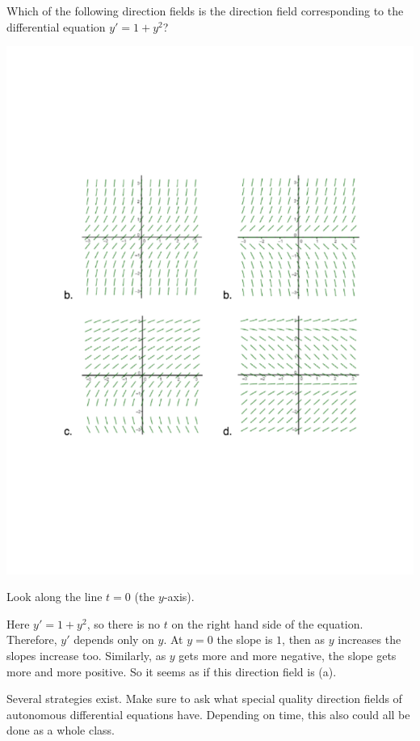\documentclass[noinstructornotes]{ximera}
\begin{document}
\begin{problem}
Which of the following direction fields is the direction field corresponding to the differential equation $y' = 1+y^2$?

	
	\begin{image}
	\includegraphics[trim= 250 200 250 200,scale=0.8]{Figure8-2-3.pdf}
	\end{image}
	
	\begin{freeResponse}
	Look along the line $t=0$ (the $y$-axis).

	Here $y' = 1+y^2$, so there is no $t$ on the right hand side of the equation.  
	Therefore, $y'$ depends only on $y$.  
	At $y=0$ the slope is $1$, then as $y$ increases the slopes increase too.  
	Similarly, as $y$ gets more and more negative, the slope gets more and more positive.  
	So it seems as if this direction field is (a).

	\end{freeResponse}

\end{problem}

\begin{instructorNotes}
Several strategies exist.  
Make sure to ask what special quality direction fields of autonomous differential equations have.  
Depending on time, this also could all be done as a whole class.
\end{instructorNotes}











	
	
	

	










								
				
				
	
\end{document}
